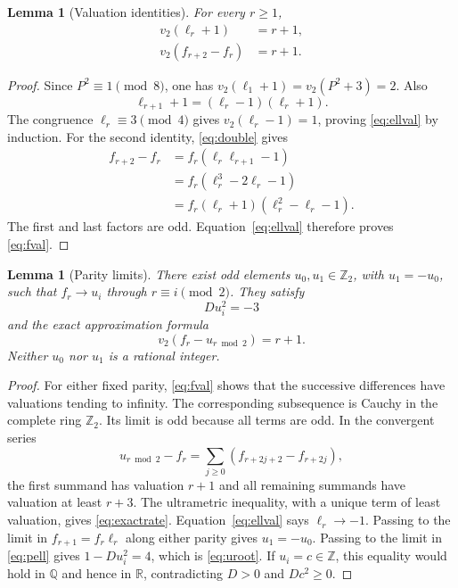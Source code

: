 \documentclass[11pt,a4paper]{article}
\newtheorem{lemma}[theorem]{Lemma}
\theoremstyle{definition}\newtheorem{definition}[theorem]{Definition}
\theoremstyle{remark}\newtheorem{remark}[theorem]{Remark}
\newcommand{\Q}{\mathbb Q}\newcommand{\Z}{\mathbb Z}\newcommand{\N}{\mathbb N}\newcommand{\R}{\mathbb R}\newcommand{\C}{\mathbb C}
\begin{document}
\begin{lemma}[Valuation identities]\label{lem:valuations}
For every $r\ge1$,
\begin{align}
 v_2(\ell_r+1)&=r+1,\label{eq:ellval}\\
 v_2(f_{r+2}-f_r)&=r+1.\label{eq:fval}
\end{align}
\end{lemma}
\begin{proof}
Since $P^2\equiv1\pmod8$, one has
$v_2(\ell_1+1)=v_2(P^2+3)=2$. Also
\[
 \ell_{r+1}+1=(\ell_r-1)(\ell_r+1).
\]
The congruence $\ell_r\equiv3\pmod4$ gives
$v_2(\ell_r-1)=1$, proving \eqref{eq:ellval} by induction.
For the second identity, \eqref{eq:double} gives
\begin{align*}
 f_{r+2}-f_r
 &=f_r(\ell_r\ell_{r+1}-1)\\
 &=f_r(\ell_r^3-2\ell_r-1)\\
 &=f_r(\ell_r+1)(\ell_r^2-\ell_r-1).
\end{align*}
The first and last factors are odd. Equation~\eqref{eq:ellval}
therefore proves \eqref{eq:fval}.
\end{proof}

\begin{lemma}[Parity limits]\label{lem:limits}
There exist odd elements $u_0,u_1\in\Z_2$, with $u_1=-u_0$, such that
$f_r\to u_i$ through $r\equiv i\pmod2$. They satisfy
\begin{equation}\label{eq:uroot}
 Du_i^2=-3
\end{equation}
and the exact approximation formula
\begin{equation}\label{eq:exactrate}
 v_2(f_r-u_{r\bmod2})=r+1.
\end{equation}
Neither $u_0$ nor $u_1$ is a rational integer.
\end{lemma}
\begin{proof}
For either fixed parity, \eqref{eq:fval} shows that the successive
differences have valuations tending to infinity. The corresponding
subsequence is Cauchy in the complete ring $\Z_2$. Its limit is odd
because all terms are odd. In the convergent series
\[
 u_{r\bmod2}-f_r
 =\sum_{j\ge0}(f_{r+2j+2}-f_{r+2j}),
\]
the first summand has valuation $r+1$ and all remaining summands have
valuation at least $r+3$. The ultrametric inequality, with a unique
term of least valuation, gives \eqref{eq:exactrate}.
Equation~\eqref{eq:ellval} says $\ell_r\to-1$. Passing to the limit
in $f_{r+1}=f_r\ell_r$ along either parity gives $u_1=-u_0$.
Passing to the limit in \eqref{eq:pell} gives $1-Du_i^2=4$, which is
\eqref{eq:uroot}. If $u_i=c\in\Z$, this equality would hold in
$\Q$ and hence in $\R$, contradicting $D>0$ and $Dc^2\ge0$.
\end{proof}
\end{document}
